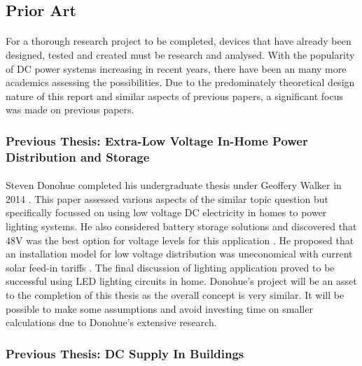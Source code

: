 
\subsection{Prior Art}

\paragraph{}
For a thorough research project to be completed, devices that have already been designed, tested and created must be research and analysed. With the popularity of DC power systems increasing in recent years, there have been an many more academics assessing the possibilities. Due to the predominately theoretical design nature of this report and similar aspects of previous papers, a significant focus was made on previous papers.  

\subsubsection{Previous Thesis: Extra-Low Voltage In-Home Power Distribution and Storage}

\paragraph{}
Steven Donohue completed his undergraduate thesis under Geoffery Walker in 2014 \cite{Donohue2014}. This paper assessed various aspects of the similar topic question but specifically focussed on using low voltage DC electricity in homes to power lighting systems. He also considered battery storage solutions and discovered that 48V was the best option for voltage levels for this application \cite{Donohue2014}. He proposed that an installation model for low voltage distribution was uneconomical with current solar feed-in tariffs \cite{Donohue2014}. The final discussion of lighting application proved to be successful using LED lighting circuits in home. Donohue's project will be an asset to the completion of this thesis as the overall concept is very similar. It will be possible to make some assumptions and avoid investing time on smaller calculations due to Donohue's extensive research.         

\subsubsection{Previous Thesis: DC Supply In Buildings}

